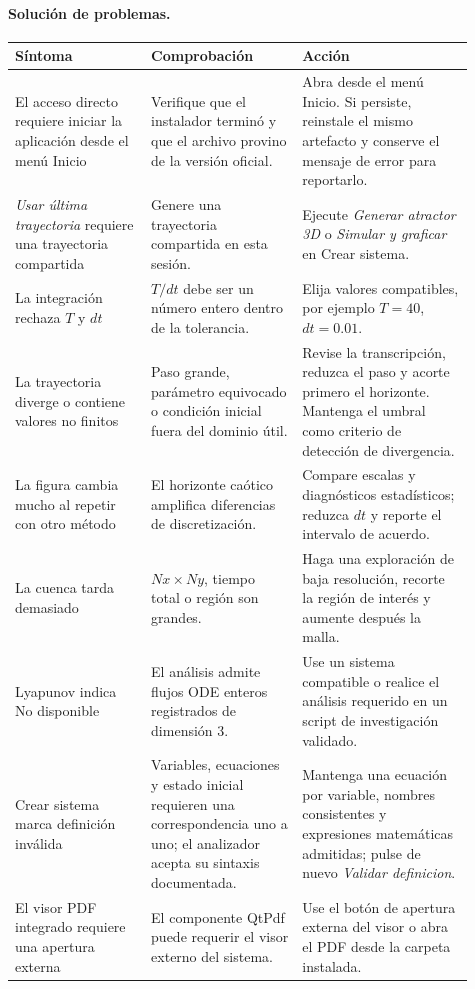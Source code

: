 \documentclass[11pt]{article}
\newcommand{\boton}[1]{\textsf{\itshape #1}}
\newcommand{\campo}[1]{\textsf{#1}}
\begin{document}
\paragraph{Solución de problemas.}

\begin{longtable}{>{\raggedright\arraybackslash}p{0.27\linewidth}>{\raggedright\arraybackslash}p{0.30\linewidth}>{\raggedright\arraybackslash}p{0.34\linewidth}}
\toprule
Síntoma & Comprobación & Acción \\
\midrule
\endhead
El acceso directo requiere iniciar la aplicación desde el menú Inicio & Verifique que el instalador terminó y que el archivo provino de la versión oficial. & Abra desde el menú Inicio. Si persiste, reinstale el mismo artefacto y conserve el mensaje de error para reportarlo. \\
\boton{Usar última trayectoria} requiere una trayectoria compartida & Genere una trayectoria compartida en esta sesión. & Ejecute \boton{Generar atractor 3D} o \boton{Simular y graficar} en \campo{Crear sistema}. \\
La integración rechaza \(T\) y \(dt\) & \(T/dt\) debe ser un número entero dentro de la tolerancia. & Elija valores compatibles, por ejemplo \(T=40\), \(dt=0.01\). \\
La trayectoria diverge o contiene valores no finitos & Paso grande, parámetro equivocado o condición inicial fuera del dominio útil. & Revise la transcripción, reduzca el paso y acorte primero el horizonte. Mantenga el umbral como criterio de detección de divergencia. \\
La figura cambia mucho al repetir con otro método & El horizonte caótico amplifica diferencias de discretización. & Compare escalas y diagnósticos estadísticos; reduzca \(dt\) y reporte el intervalo de acuerdo. \\
La cuenca tarda demasiado & \(Nx\times Ny\), tiempo total o región son grandes. & Haga una exploración de baja resolución, recorte la región de interés y aumente después la malla. \\
Lyapunov indica \campo{No disponible} & El análisis admite flujos ODE enteros registrados de dimensión 3. & Use un sistema compatible o realice el análisis requerido en un script de investigación validado. \\
\campo{Crear sistema} marca definición inválida & Variables, ecuaciones y estado inicial requieren una correspondencia uno a uno; el analizador acepta su sintaxis documentada. & Mantenga una ecuación por variable, nombres consistentes y expresiones matemáticas admitidas; pulse de nuevo \boton{Validar definicion}. \\
El visor PDF integrado requiere una apertura externa & El componente QtPdf puede requerir el visor externo del sistema. & Use el botón de apertura externa del visor o abra el PDF desde la carpeta instalada. \\
\bottomrule
\end{longtable}
\end{document}
